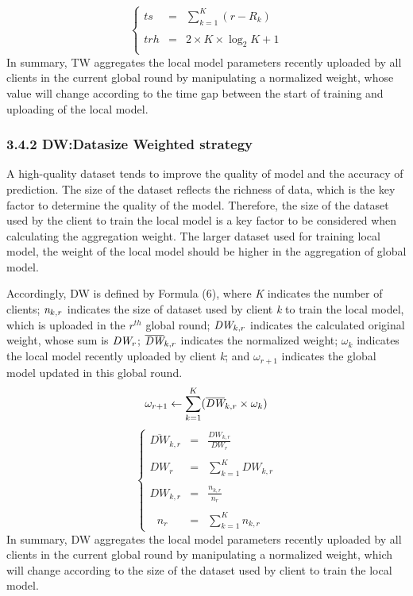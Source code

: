 \documentclass[twoside,twocolumn]{article}
\begin{document}
\begin{equation}
\left\{
\begin{array}{lll}
ts &=& \sum_{k=1}^{K} (r - R_{k})\\
\\
trh&=&2\times K \times \log_{2}{K} + 1\\
\end{array}
\right.
\end{equation}
	In summary, TW aggregates the local model parameters recently uploaded by all clients in the current global round by manipulating a normalized weight, whose value will change according to the time gap between the start of training and uploading of the local model.
%
\subsubsection{3.4.2 DW:Datasize Weighted strategy}A high-quality dataset tends to improve the quality of model and the accuracy of prediction. The size of the dataset reflects the richness of data, which is the key factor to determine the quality of the model. Therefore, the size of the dataset used by the client to train the local model is a key factor to be considered when calculating the aggregation weight. The larger dataset used for training local model, the weight of the local model should be higher in the aggregation of global model.

	Accordingly, DW is defined by Formula (6), where \emph{K} indicates the number of clients; $\emph{n}_{k,r}$ indicates the size of dataset used by client \emph{k} to train the local model, which is uploaded in the $r^{th}$ global round; $\emph{DW}_{k,r}$ indicates the calculated original weight, whose sum is $\emph{DW}_{r}$; $\overline{\emph{DW}}_{k,r}$ indicates the normalized weight; $\omega_k$ indicates the local model recently uploaded by client \emph{k}; and $\omega_{r+1}$ indicates the global model updated in this global round.
\begin{equation}
\omega_{r+1} \leftarrow \sum_{k=1}^{K}(\overline{\emph{DW}}_{k,r} \times \omega_k)
\end{equation}
%
\begin{equation}
\left\{
\begin{array}{lll}
\overline{DW}_{k,r} & = & \frac{DW_{k,r}}{DW_{r}}\\
\\
DW_{r} & = & \sum_{k=1}^{K} DW_{k,r}\\
\\
DW_{k,r} & = & \frac{n_{k,r}}{n_{r}}\\
\\
\ \ \ n_{r}&=&\sum_{k=1}^{K}n_{k,r}
\end{array}
\right.
\end{equation}
	In summary, DW aggregates the local model parameters recently uploaded by all clients in the current global round by manipulating a normalized weight, which will change according to the size of the dataset used by client to train the local model.
%
\end{document}
